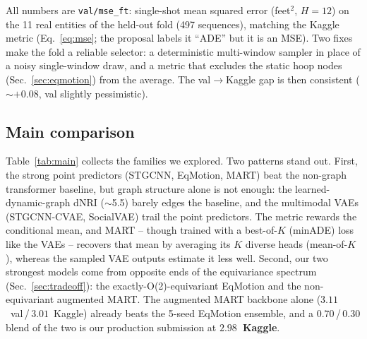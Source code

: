 \documentclass{article} %
\begin{document}
All numbers are \texttt{val/mse\_ft}: single-shot mean squared error (feet$^2$,
$H{=}12$) on the 11 real entities of the held-out fold (497 sequences), matching
the Kaggle metric (Eq.~\ref{eq:mse}; the proposal labels it ``ADE'' but it is an
MSE). Two fixes make the fold a reliable selector: a deterministic multi-window
sampler in place of a noisy single-window draw, and a metric that excludes the
static hoop nodes (Sec.~\ref{sec:eqmotion}) from the average. The
val$\rightarrow$Kaggle gap is then consistent ($\sim{+}0.08$, val slightly
pessimistic).

\subsection{Main comparison}
\label{sec:main-results}
Table~\ref{tab:main} collects the families we explored. Two patterns stand out.
First, the strong point predictors (STGCNN, EqMotion, MART) beat the non-graph
transformer baseline, but graph structure alone is not enough: the
learned-dynamic-graph dNRI ($\sim$5.5) barely edges the baseline, and the
multimodal VAEs (STGCNN-CVAE, SocialVAE) trail the point predictors. The metric
rewards the conditional mean, and MART -- though trained with a best-of-$K$
(minADE) loss like the VAEs -- recovers that mean by averaging its $K$ diverse
heads (mean-of-$K$), whereas the sampled VAE outputs estimate it less well.
Second, our two strongest models come from opposite ends of the equivariance
spectrum (Sec.~\ref{sec:tradeoff}): the exactly-O(2)-equivariant EqMotion and the
non-equivariant augmented MART. The augmented MART backbone alone
($3.11$~val\,/\,$3.01$~Kaggle) already beats the 5-seed EqMotion ensemble, and a
$0.70$\,/\,$0.30$ blend of the two is our production submission at
\textbf{$2.98$~Kaggle}.
\end{document}
